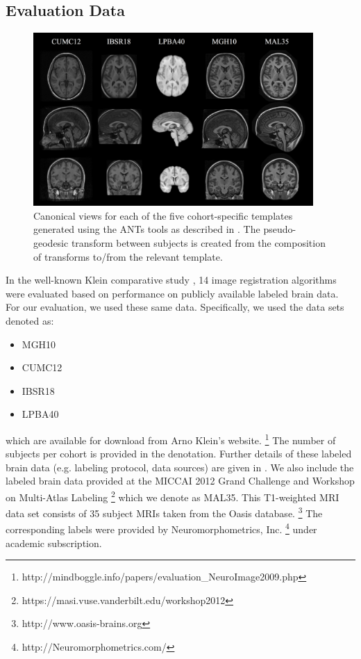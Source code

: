 \documentclass{frontiersSCNS}
\begin{document}
\subsection{Evaluation Data}

\begin{figure}[htb]
  \centering
  \includegraphics[width=0.95\textwidth]{templates.jpg}
  \caption{Canonical views for each of the five cohort-specific templates generated using
  the ANTs tools as described
  in \cite{avants2010}.   The pseudo-geodesic transform between subjects is created from 
  the composition of transforms to/from the relevant template.
  }
  \label{fig:templates}
\end{figure}

In the well-known Klein comparative study \citep{klein2009}, 14 image registration
algorithms were evaluated based on performance on publicly available labeled brain data.
For our evaluation, we used these same data.  
Specifically, we used the data sets denoted as:
\begin{itemize}
  \item MGH10 
  \item CUMC12
  \item IBSR18
  \item LPBA40
\end{itemize}
which are available for download from Arno Klein's website.%
\footnote{
http://mindboggle.info/papers/evaluation\_NeuroImage2009.php
}
The number of subjects per cohort is provided in the denotation.
Further details of these labeled brain data (e.g. labeling protocol,
data sources) are given in \citep{klein2009}.
We also include the labeled brain data provided at the
MICCAI 2012 Grand Challenge and Workshop on Multi-Atlas
Labeling%
\footnote{
https://masi.vuse.vanderbilt.edu/workshop2012
} 
which we denote as MAL35.  This T1-weighted
MRI data set consists of 35 subject MRIs taken from the
Oasis database.%
\footnote{
http://www.oasis-brains.org
}  The corresponding labels were provided by Neuromorphometrics,
Inc.%
\footnote{
http://Neuromorphometrics.com/
}
under academic subscription.
\end{document}
